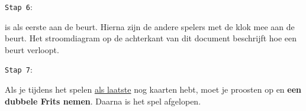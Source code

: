 \noindent
\begin{minipage}[t]{.09\textwidth}
\texttt{Stap 6}:
\end{minipage}
\hfill
\begin{minipage}[t]{.91\textwidth}
\Willem is als eerste aan de beurt. Hierna zijn de andere spelers met de klok mee aan de beurt. Het stroomdiagram op de achterkant van dit document beschrijft hoe een beurt verloopt. \\
\end{minipage}

\noindent
\begin{minipage}[t]{.09\textwidth}
\texttt{Stap 7}:
\end{minipage}
\hfill
\begin{minipage}[t]{.91\textwidth}
Als je tijdens het spelen \ul{als laatste} nog kaarten hebt, moet je proosten op  en \textbf{een dubbele Frits nemen}. Daarna is het spel afgelopen.  \\
\end{minipage}




